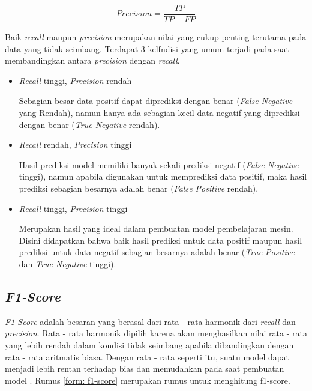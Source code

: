 \begin{equation}
    Precision = \frac{TP}{TP+FP}
    \label{form:precision}
\end{equation}

Baik \textit{recall} maupun \textit{precision} merupakan nilai yang cukup penting terutama pada data yang tidak seimbang. Terdapat 3 kelfndisi yang umum terjadi pada saat membandingkan antara \textit{precision} dengan \textit{recall}.

\begin{itemize}
    \item \textit{Recall} tinggi, \textit{Precision} rendah

          Sebagian besar data positif dapat diprediksi dengan benar (\textit{False Negative} yang Rendah), namun hanya ada sebagian kecil data negatif yang diprediksi dengan benar (\textit{True Negative} rendah).

    \item \textit{Recall} rendah, \textit{Precision} tinggi

          Hasil prediksi model memiliki banyak sekali prediksi negatif (\textit{False Negative} tinggi), namun apabila digunakan untuk memprediksi data positif, maka hasil prediksi sebagian besarnya adalah benar (\textit{False Positive} rendah).

    \item \textit{Recall} tinggi, \textit{Precision} tinggi

          Merupakan hasil yang ideal dalam pembuatan model pembelajaran mesin. Disini didapatkan bahwa baik hasil prediksi untuk data positif maupun hasil prediksi untuk data negatif sebagian besarnya adalah benar (\textit{True Positive} dan \textit{True Negative} tinggi).

\end{itemize}

\subsection{\textit{F1-Score}}

\textit{F1-Score} adalah besaran yang berasal dari rata - rata harmonik dari \textit{recall} dan \textit{precision}. Rata  - rata harmonik dipilih karena akan menghasilkan nilai rata - rata yang lebih rendah dalam kondisi tidak seimbang apabila dibandingkan dengan rata - rata aritmatis biasa. Dengan rata - rata seperti itu, suatu model dapat menjadi lebih rentan terhadap bias dan memudahkan pada saat pembuatan model \cite{metrics_ml}. Rumus \ref{form: f1-score} merupakan rumus untuk menghitung f1-score.

